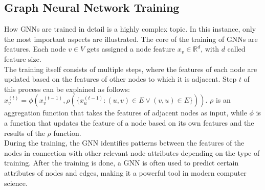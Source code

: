\documentclass[acmsmall,nonacm,screen,review]{acmart}
\begin{document}
\subsection{Graph Neural Network Training}
How GNNs are trained in detail is a highly complex topic. In this instance, only the most important aspects are illustrated. The core of the training of GNNs are features. Each node $v \in V$ gets assigned a node feature $x_{v} \in \mathbb{R}^{d}$, with $d$ called feature size. \\
The training itself consists of multiple steps, where the features of each node are updated based on the features of other nodes to which it is adjacent. Step $t$ of this process can be explained as follows: $x_{v}^{(t)} = \phi(x_{v}^{(t-1)},\rho(\{x_{u}^{(t-1)} : (u,v) \in E \vee (v,u)\in E\}))$. $\rho$ is an aggregation function that takes the features of adjacent nodes as input, while $\phi$ is a function that updates the feature of a node based on its own features and the results of the $\rho$ function.\\ 
During the training, the GNN identifies patterns between the features of the nodes in connection with other relevant node attributes depending on the type of training. After the training is done, a GNN is often used to predict certain attributes of nodes and edges, making it a powerful tool in modern computer science.
\end{document}
